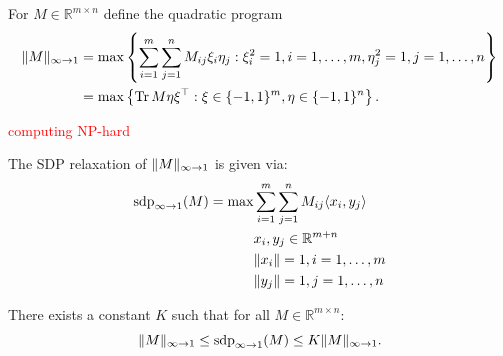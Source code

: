 	\begin{dfn}
		For $M\in\mathbb{R}^{m\times n}$ define the quadratic program
		\begin{align}
			 \Vert {M} \Vert_{\infty\to 1} &= \max \left\{ \sum_{i=1}^m \sum_{j=1}^n M_{ij} \xi_i \eta_j : \xi_i^2=1, i=1,\dots,m, \eta_j^2=1, j =1,\dots,n \right\} \nonumber\\ 
			&=\max\left\{\textup{Tr} \, {M \eta\xi^\top } : \xi\in\{-1,1\}^m,\eta\in\{-1,1\}^n\right\}.
		\end{align}
	\end{dfn}
	\textcolor{red}{computing NP-hard}
	\begin{dfn} The SDP relaxation of $ \Vert {M} \Vert_{\infty\to1}$ is given via:
		\begin{align*}
			\operatorname{sdp}_{\infty\to 1} (M) = \max 
			&\sum_{i=1}^m\sum_{j=1}^n M_{ij} \langle{x_i},{y_j}\rangle\\
			&x_i,y_j\in\mathbb{R}^{m+n}\\
			& \Vert {x_i} \Vert=1, i=1,\dots,m\\
			& \Vert {y_j} \Vert=1, j=1,\dots,n
		\end{align*}
	\end{dfn}
	\begin{theo} \label{theo:G_ineq}
		There exists a constant $K$ such that for all $M\in\mathbb{R}^{m\times n}$:
		\begin{equation}
			 \Vert {M} \Vert_{\infty\to 1} \leq \operatorname{sdp}_{\infty\to 1} (M) \leq K  \Vert {M} \Vert_{\infty\to 1}.
		\end{equation}
	\end{theo}

